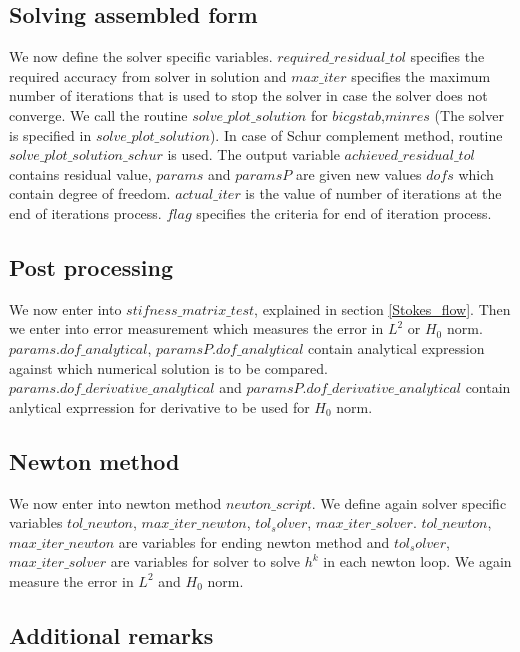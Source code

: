 \documentclass[a4paper,12pt]{book}
\begin{document}
\subsection{Solving assembled form}

We now define the solver specific variables. $required\_residual\_tol$ specifies the required accuracy from solver in solution and $max\_iter$ specifies the maximum number of iterations that is used to stop the solver in case the solver does not converge. We call the routine $solve\_plot\_solution$ for $bicgstab$,$minres$ (The solver is specified in $solve\_plot\_solution$). In case of Schur complement method, routine $solve\_plot\_solution\_schur$ is used. The output variable $achieved\_residual\_tol$ contains residual value, $params$ and $paramsP$ are given new values $dofs$ which contain degree of freedom. $actual\_iter$ is the value of number of iterations at the end of iterations process. $flag$ specifies the criteria for end of iteration process.\\

\subsection{Post processing}

We now enter into $stifness\_matrix\_test$, explained in section \ref{Stokes_flow}. Then we enter into error measurement which measures the error in $L^2$ or $H_0$ norm. $params.dof\_analytical$, $paramsP.dof\_analytical$ contain analytical expression against which numerical solution is to be compared. $params.dof\_derivative\_analytical$ and  $paramsP.dof\_derivative\_analytical$ contain anlytical exprression for derivative to be used for $H_0$ norm.\\

\subsection{Newton method}

We now enter into newton method $newton\_script$. We define again solver specific variables $tol\_newton$, $max\_iter\_newton$, $tol_solver$, $max\_iter\_solver$. $tol\_newton$, $max\_iter\_newton$ are variables for ending newton method and $tol_solver$, $max\_iter\_solver$ are variables for solver to solve $h^k$ in each newton loop. We again measure the error in $L^2$ and $H_0$ norm.\\

\subsection{Additional remarks}
\end{document}
